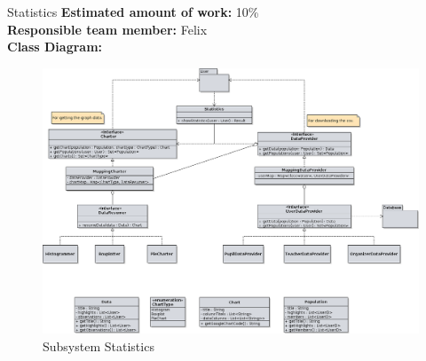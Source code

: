 \begin{subsection}{Statistics}
	\textbf{Estimated amount of work:} 10\% \\
	\textbf{Responsible team member:} Felix \\
	\textbf{Class Diagram:} \\
	
	\begin{figure}[!h]
	  \centering
		\includegraphics[width=1\textwidth]{../class_diagrams/statistics.png}
	  \caption{Subsystem Statistics}
	  \label{subsystem_question}
	\end{figure}
	
\end{subsection}
